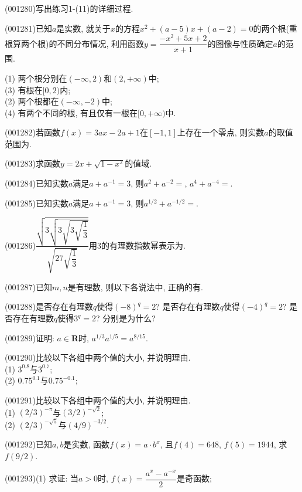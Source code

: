 \item (001280)写出练习1-(11)的详细过程.
\item (001281)已知$a$是实数, 就关于$x$的方程$x^2+(a-5)x+(a-2)=0$的两个根(重根算两个根)的不同分布情况, 利用函数$y=\dfrac{-x^2+5x+2}{x+1}$的图像与性质确定$a$的范围.\\ 
\begin{multicols}{2}
(1) 两个根分别在$(-\infty,2)$和$(2,+\infty)$中;\\ 
(3) 有根在$[0,2)$内;\\ 
(2) 两个根都在$(-\infty,-2)$中;\\ 
(4) 有两个不同的根, 有且仅有一根在$[0,+\infty)$中.\\ 
\end{multicols}
\item (001282)若函数$f(x)=3ax-2a+1$在$[-1,1]$上存在一个零点, 则实数$a$的取值范围为.
\item (001283)求函数$y=2x+\sqrt{1-x^2}$的值域.
\item (001284)已知实数$a$满足$a+a^{-1}=3$, 则$a^2+a^{-2}=$, $a^4+a^{-4}=$.
\item (001285)已知实数$a$满足$a+a^{-1}=3$, 则$a^{1/2}+a^{-1/2}=$.
\item (001286)$\dfrac{\sqrt{3\sqrt{3\sqrt{3\sqrt{\dfrac{1}{3}}}}}}{\sqrt{27\sqrt{\dfrac{1}{3}}}}$用$3$的有理数指数幂表示为.
\item (001287)已知$m,n$是有理数, 则以下各说法中, 正确的有.
\item (001288)是否存在有理数$q$使得$(-8)^q=2$? 是否存在有理数$q$使得$(-4)^q=2$? 是否存在有理数$q$使得$3^q=2$? 分别是为什么?
\item (001289)证明: $a\in \mathbf{R}$时, $a^{1/3}a^{1/5}=a^{8/15}$.
\item (001290)比较以下各组中两个值的大小, 并说明理由.\\ 
(1) $3^{0.8}$与$3^{0.7}$;\\ 
(2) $0.75^{0.1}$与$0.75^{-0.1}$;
\item (001291)比较以下各组中两个值的大小, 并说明理由.\\ 
(1) $(2/3)^{-\pi}$与$(3/2)^{-\sqrt{2}}$;\\ 
(2) $(2/3)^{-\sqrt{5}}$与$(4/9)^{-3/2}$.
\item (001292)已知$a,b$是实数, 函数$f(x)=a\cdot b^x$, 且$f(4)=648$, $f(5)=1944$, 求$f(9/2)$.
\item (001293)(1) 求证: 当$a>0$时, $f(x)=\dfrac{a^x-a^{-x}}{2}$是奇函数;\\ 

